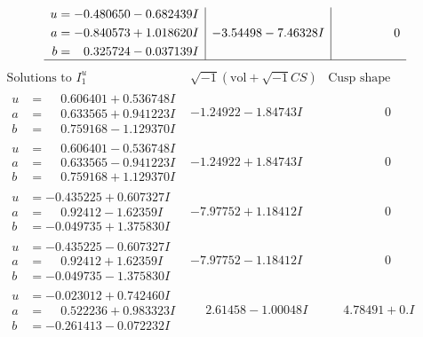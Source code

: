 \documentclass[1p]{elsarticle_modified}
\theoremstyle{definition}
\newcommand{\I}{\sqrt{-1}}
\begin{document}
$$\begin{array}{c|c|c}
\begin{aligned}
u &= -0.480650 - 0.682439 I \\
a &= -0.840573 + 1.018620 I \\
b &= \phantom{-}0.325724 - 0.037139 I\end{aligned}
 & -3.54498 - 7.46328 I & \phantom{-0.000000 } 0\\
 \hline 
 \end{array}$$\newpage$$\begin{array}{c|c|c}  
\text{Solutions to }I^u_{1}& \I (\text{vol} + \sqrt{-1}CS) & \text{Cusp shape}\\
 \hline 
\begin{aligned}
u &= \phantom{-}0.606401 + 0.536748 I \\
a &= \phantom{-}0.633565 + 0.941223 I \\
b &= \phantom{-}0.759168 - 1.129370 I\end{aligned}
 & -1.24922 - 1.84743 I & \phantom{-0.000000 } 0 \\ \hline\begin{aligned}
u &= \phantom{-}0.606401 - 0.536748 I \\
a &= \phantom{-}0.633565 - 0.941223 I \\
b &= \phantom{-}0.759168 + 1.129370 I\end{aligned}
 & -1.24922 + 1.84743 I & \phantom{-0.000000 } 0 \\ \hline\begin{aligned}
u &= -0.435225 + 0.607327 I \\
a &= \phantom{-}0.92412 - 1.62359 I \\
b &= -0.049735 + 1.375830 I\end{aligned}
 & -7.97752 + 1.18412 I & \phantom{-0.000000 } 0 \\ \hline\begin{aligned}
u &= -0.435225 - 0.607327 I \\
a &= \phantom{-}0.92412 + 1.62359 I \\
b &= -0.049735 - 1.375830 I\end{aligned}
 & -7.97752 - 1.18412 I & \phantom{-0.000000 } 0 \\ \hline\begin{aligned}
u &= -0.023012 + 0.742460 I \\
a &= \phantom{-}0.522236 + 0.983323 I \\
b &= -0.261413 - 0.072232 I\end{aligned}
 & \phantom{-}2.61458 - 1.00048 I & \phantom{-}4.78491 + 0. I\phantom{ +0.000000I} \\ \hline\begin{aligned}

\end{aligned}
\end{array}$$
\end{document}
